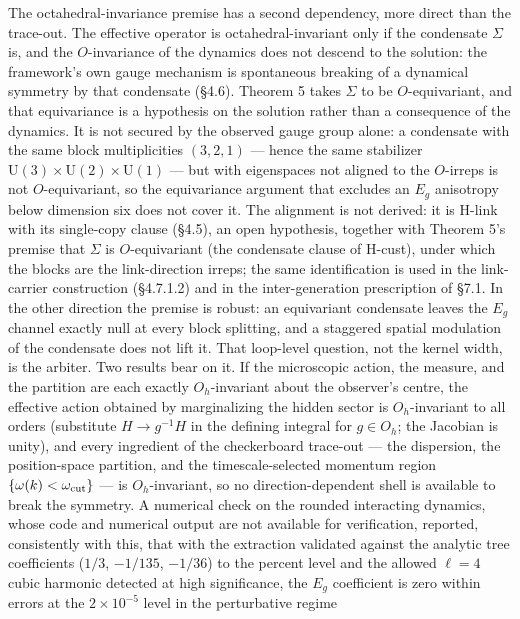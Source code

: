 \documentclass[
]{article}
\begin{document}
The octahedral-invariance premise has a second dependency, more direct
than the trace-out. The effective operator is octahedral-invariant only
if the condensate \(\Sigma\) is, and the \(O\)-invariance of the
dynamics does not descend to the solution: the framework's own gauge
mechanism is spontaneous breaking of a dynamical symmetry by that
condensate (§4.6). Theorem 5 takes \(\Sigma\) to be \(O\)-equivariant,
and that equivariance is a hypothesis on the solution rather than a
consequence of the dynamics. It is not secured by the observed gauge
group alone: a condensate with the same block multiplicities
\((3, 2, 1)\) --- hence the same stabilizer
\(\mathrm{U}(3) \times \mathrm{U}(2) \times \mathrm{U}(1)\) --- but with
eigenspaces not aligned to the \(O\)-irreps is not \(O\)-equivariant, so
the equivariance argument that excludes an \(E_g\) anisotropy below
dimension six does not cover it. The alignment is not derived: it is
H-link with its single-copy clause (§4.5), an open hypothesis, together
with Theorem 5's premise that \(\Sigma\) is \(O\)-equivariant (the
condensate clause of H-cust), under which the blocks are the
link-direction irreps; the same identification is used in the
link-carrier construction (§4.7.1.2) and in the inter-generation
prescription of §7.1. In the other direction the premise is robust: an
equivariant condensate leaves the \(E_g\) channel exactly null at every
block splitting, and a staggered spatial modulation of the condensate
does not lift it. That loop-level question, not the kernel width, is the
arbiter. Two results bear on it. If the microscopic action, the measure,
and the partition are each exactly \(O_h\)-invariant about the
observer's centre, the effective action obtained by marginalizing the
hidden sector is \(O_h\)-invariant to all orders (substitute
\(H \to g^{-1}H\) in the defining integral for \(g \in O_h\); the
Jacobian is unity), and every ingredient of the checkerboard trace-out
--- the dispersion, the position-space partition, and the
timescale-selected momentum region \(\{\omega(k)<\omega_{\rm cut}\}\)
--- is \(O_h\)-invariant, so no direction-dependent shell is available
to break the symmetry. A numerical check on the rounded interacting
dynamics, whose code and numerical output are not available for
verification, reported, consistently with this, that with the extraction
validated against the analytic tree coefficients (\(1/3\), \(-1/135\),
\(-1/36\)) to the percent level and the allowed \(\ell=4\) cubic
harmonic detected at high significance, the \(E_g\) coefficient is zero
within errors at the \(2\times10^{-5}\) level in the perturbative regime
\end{document}
